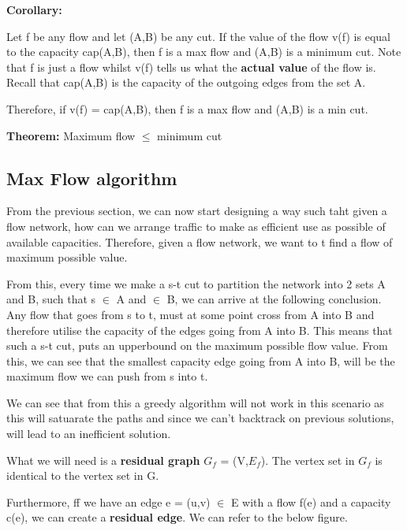 \documentclass[11pt, oneside]{article}
\theoremstyle{definition}
\begin{document}
\textbf{Corollary: }

Let f be any flow and let (A,B) be any cut. If the value of the flow v(f) is equal to the capacity cap(A,B), then f is a max flow and (A,B) is a minimum cut. Note that f is just a flow whilst v(f) tells us what the \textbf{actual value} of the flow is. Recall that cap(A,B) is the capacity of the outgoing edges from the set A.
\begin{center}
  Therefore, if v(f) = cap(A,B), then f is a max flow and (A,B) is a min cut.
\end{center}

\textbf{Theorem: } Maximum flow $\leq$ minimum cut

\subsection{Max Flow algorithm}
From the previous section, we can now start designing a way such taht given a flow network, how can we arrange traffic to make as efficient use as possible of available capacities. Therefore, given a flow network, we want to t find a flow of maximum possible value.

From this, every time we make a s-t cut to partition the network into 2 sets A and B, such that s $\in$ A and $\in$ B, we can arrive at the following conclusion. Any flow that goes from s to t, must at some point cross from A into B and therefore utilise the capacity of the edges going from A into B. This means that such a s-t cut, puts an upperbound on the maximum possible flow value. From this, we can see that the smallest capacity edge going from A into B, will be the maximum flow we can push from s into t.

We can see that from this a greedy algorithm will not work in this scenario as this will satuarate the paths and since we can't backtrack on previous solutions, will lead to an inefficient solution.

What we will need is a \textbf{residual graph} $G_{f}$ = (V,$E_f$). The vertex set in $G_f$ is identical to the vertex set in G.

Furthermore, ff we have an edge e = (u,v) $\in$ E with a flow f(e) and a capacity c(e), we can create a \textbf{residual edge}. We can refer to the below figure.
\end{document}
